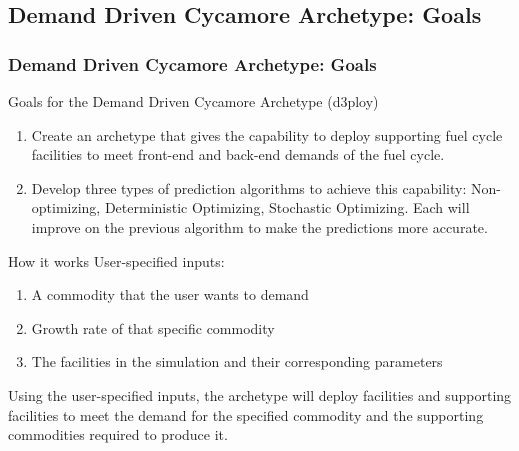 \subsection{Demand Driven Cycamore Archetype: Goals}
\begin{frame}
  \frametitle{Demand Driven Cycamore Archetype: Goals}

\begin{block}{Goals for the Demand Driven Cycamore Archetype (d3ploy)}
\begin{enumerate}
	\item Create an archetype that gives \Cyclus the capability to deploy supporting fuel cycle facilities to meet front-end and back-end demands of the fuel cycle. 
	\item Develop three types of prediction algorithms to achieve this capability: Non-optimizing, Deterministic Optimizing, Stochastic Optimizing. Each will improve on the previous algorithm to make the predictions more accurate. 
\end{enumerate}
\end{block}

\begin{block}{How it works}
User-specified inputs: 
\begin{enumerate}
	\item A commodity that the user wants to demand
	\item Growth rate of that specific commodity 
	\item The facilities in the simulation and their corresponding parameters
\end{enumerate}
Using the user-specified inputs, the archetype will deploy facilities and supporting facilities to meet the demand for the specified commodity and the supporting commodities required to produce it. 
\end{block}

\end{frame}

